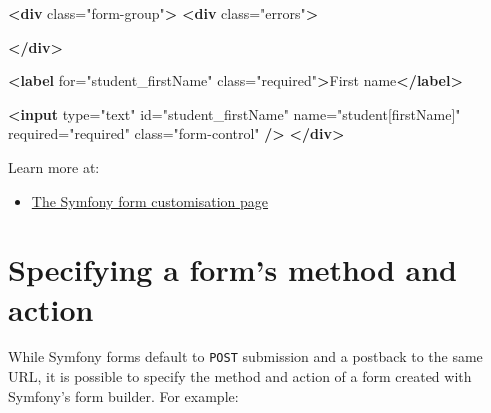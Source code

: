 \documentclass[a4paperpaper,openright]{book}
\newenvironment{Shaded}{}{}
\newcommand{\KeywordTok}[1]{\textcolor[rgb]{0.00,0.44,0.13}{\textbf{#1}}}
\newcommand{\NormalTok}[1]{#1}
\newcommand{\OtherTok}[1]{\textcolor[rgb]{0.00,0.44,0.13}{#1}}
\newcommand{\StringTok}[1]{\textcolor[rgb]{0.25,0.44,0.63}{#1}}
\providecommand{\tightlist}{%
  \setlength{\itemsep}{0pt}\setlength{\parskip}{0pt}}
\begin{document}
\begin{Shaded}
\begin{Highlighting}[]

   \KeywordTok{<div}\OtherTok{ class=}\StringTok{"form-group"}\KeywordTok{>}
    \KeywordTok{<div}\OtherTok{ class=}\StringTok{"errors"}\KeywordTok{>}
        
    \KeywordTok{</div>}

    \KeywordTok{<label}\OtherTok{ for=}\StringTok{"student_firstName"}\OtherTok{ class=}\StringTok{"required"}\KeywordTok{>}\NormalTok{First name}\KeywordTok{</label>}

    \KeywordTok{<input}\OtherTok{ type=}\StringTok{"text"}\OtherTok{ id=}\StringTok{"student_firstName"}\OtherTok{ name=}\StringTok{"student[firstName]"}\OtherTok{ required=}\StringTok{"required"}\OtherTok{ class=}\StringTok{"form-control"} \KeywordTok{/>}
    \KeywordTok{</div>}
\end{Highlighting}
\end{Shaded}

Learn more at:

\begin{itemize}
\tightlist
\item
  \href{https://symfony.com/doc/current/form/form_customization.html}{The
  Symfony form customisation page}
\end{itemize}

\hypertarget{specifying-a-forms-method-and-action}{%
\section{\texorpdfstring{Specifying a form's \textbf{method} and
\textbf{action}}{Specifying a form's method and action}}\label{specifying-a-forms-method-and-action}}

While Symfony forms default to \texttt{POST} submission and a postback
to the same URL, it is possible to specify the method and action of a
form created with Symfony's form builder. For example:

\begin{Shaded}
\end{Shaded}
\end{document}
